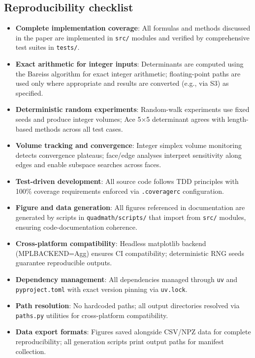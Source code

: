 \documentclass[
  10pt,
]{article}
\newcommand{\passthrough}[1]{#1}
\providecommand{\tightlist}{%
  \setlength{\itemsep}{0pt}\setlength{\parskip}{0pt}}
\begin{document}
\hypertarget{reproducibility-checklist}{%
\subsection{Reproducibility checklist}\label{reproducibility-checklist}}

\begin{itemize}
\tightlist
\item
  \textbf{Complete implementation coverage}: All formulas and methods
  discussed in the paper are implemented in
  \passthrough{\lstinline!src/!} modules and verified by comprehensive
  test suites in \passthrough{\lstinline!tests/!}.
\item
  \textbf{Exact arithmetic for integer inputs}: Determinants are
  computed using the Bareiss algorithm for exact integer arithmetic;
  floating-point paths are used only where appropriate and results are
  converted (e.g., via S3) as specified.
\item
  \textbf{Deterministic random experiments}: Random-walk experiments use
  fixed seeds and produce integer volumes; Ace 5×5 determinant agrees
  with length-based methods across all test cases.
\item
  \textbf{Volume tracking and convergence}: Integer simplex volume
  monitoring detects convergence plateaus; face/edge analyses interpret
  sensitivity along edges and enable subspace searches across faces.
\item
  \textbf{Test-driven development}: All source code follows TDD
  principles with 100\% coverage requirements enforced via
  \passthrough{\lstinline!.coveragerc!} configuration.
\item
  \textbf{Figure and data generation}: All figures referenced in
  documentation are generated by scripts in
  \passthrough{\lstinline!quadmath/scripts/!} that import from
  \passthrough{\lstinline!src/!} modules, ensuring code-documentation
  coherence.
\item
  \textbf{Cross-platform compatibility}: Headless matplotlib backend
  (MPLBACKEND=Agg) ensures CI compatibility; deterministic RNG seeds
  guarantee reproducible outputs.
\item
  \textbf{Dependency management}: All dependencies managed through
  \passthrough{\lstinline!uv!} and
  \passthrough{\lstinline!pyproject.toml!} with exact version pinning
  via \passthrough{\lstinline!uv.lock!}.
\item
  \textbf{Path resolution}: No hardcoded paths; all output directories
  resolved via \passthrough{\lstinline!paths.py!} utilities for
  cross-platform compatibility.
\item
  \textbf{Data export formats}: Figures saved alongside CSV/NPZ data for
  complete reproducibility; all generation scripts print output paths
  for manifest collection.
\end{itemize}
\end{document}

